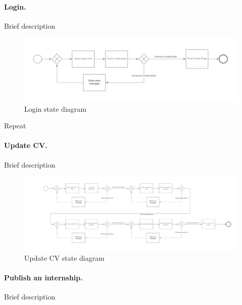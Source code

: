 \paragraph{Login.}
Brief description

\begin{figure}[H]
    \begin{center}
        \includegraphics[width=1\linewidth]{RASD/LaTeX/Images/StateDiagrams/login.png}
        \caption{Login state diagram}
        \label{fig:signup_sd}%
    \end{center}
\end{figure}

Repeat

\paragraph{Update CV.}
Brief description

\begin{figure}[H]
    \begin{center}
        \includegraphics[width=1\linewidth]{RASD/LaTeX/Images/StateDiagrams/update_cv.png}
        \caption{Update CV state diagram}
        \label{fig:signup_sd}%
    \end{center}
\end{figure}

\paragraph{Publish an internship.}
Brief description

